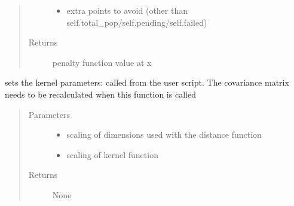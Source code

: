 \documentclass[letterpaper,12pt,english]{sphinxmanual}
\begin{document}
\begin{fulllineitems}
\begin{fulllineitems}
\begin{quote}
\begin{description}
\begin{itemize}
\item {} 
\sphinxAtStartPar
{} \textendash{} extra points to avoid (other than self.total\_pop/self.pending/self.failed)

\end{itemize}

\item[{Returns}] \leavevmode
\sphinxAtStartPar
penalty function value at x

\end{description}\end{quote}

\end{fulllineitems}


\begin{fulllineitems}
\label{\detokenize{PARyOpt:PARyOpt.paryopt.BayesOpt.set_new_kernel_parameters}}
\sphinxAtStartPar
sets the kernel parameters: called from the user script.
The covariance matrix needs to be re\sphinxhyphen{}calculated when this function is called
\begin{quote}\begin{description}
\item[{Parameters}] \leavevmode\begin{itemize}
\item {} 
\sphinxAtStartPar
{} \textendash{} scaling of dimensions used with the distance function

\item {} 
\sphinxAtStartPar
{} \textendash{} scaling of kernel function

\end{itemize}

\item[{Returns}] \leavevmode
\sphinxAtStartPar
None


\end{description}
\end{quote}
\end{fulllineitems}
\end{fulllineitems}
\end{document}

